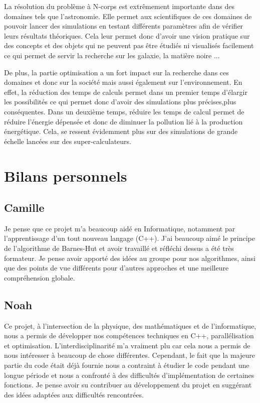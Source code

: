 La résolution du problème à N-corps est extrêmement importante dans des domaines tels que l'astronomie. Elle permet aux scientifiques de ces domaines de pouvoir lancer des simulations en testant différents paramètres afin de vérifier leurs résultats théoriques.
Cela leur permet donc d'avoir une vision pratique sur des concepts et des objets qui ne peuvent pas être étudiés ni visualisés facilement ce qui permet de servir la recherche sur les galaxie, la matière noire ...


De plus, la partie optimisation a un fort impact sur la recherche dans ces domaines et donc sur la société mais aussi également sur l'environnement. En effet, la réduction des temps de calculs permet dans un premier temps d'élargir les possibilités ce qui permet donc d'avoir des simulations plus précises,plus conséquentes. Dans un deuxième temps, réduire les temps de calcul permet de réduire l'énergie dépensée et donc de diminuer la pollution lié à la production énergétique. Cela, se ressent évidemment plus sur des simulations de grande échelle lancées sur des super-calculateurs.

\section{Bilans personnels}

\subsection{Camille}

Je pense que ce projet m’a beaucoup aidé en Informatique,
notamment par l'apprentissage d’un tout nouveau langage (C++).
J’ai beaucoup aimé le principe de l’algorithme de Barnes-Hut et
avoir travaillé et réfléchi dessus a été très formateur. Je pense
avoir apporté des idées au groupe pour nos algorithmes, ainsi que
des points de vue différents pour d’autres approches et une
meilleure compréhension globale.

\subsection{Noah}


Ce projet, à l'intersection de la physique, des mathématiques et de l'informatique, nous a permis de développer nos compétences techniques en C++, parallélisation et optimisation. L'interdisciplinarité m'a vraiment plu car cela nous a permis de nous intéresser à beaucoup de chose différentes. Cependant, le fait que la majeure partie du code était déjà fournie nous a contraint à étudier le code pendant une longue période et nous a confronté à des difficultés d'implémentation de certaines fonctions. Je pense avoir su contribuer au développement du projet en suggérant des idées adaptées aux difficultés rencontrées.

